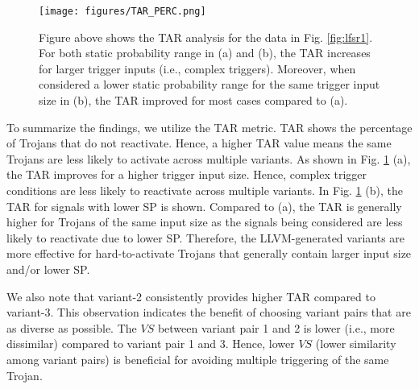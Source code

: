 \documentclass[conference]{IEEEtran}
\begin{document}
\begin{figure}[t!]
\centerline{\texttt{[image: figures/TAR\_PERC.png]}}
\caption{Figure above shows the TAR analysis for the data in Fig. \ref{fig:lfsr1}. 
For both static probability range in (a) and (b), the TAR increases for larger trigger inputs (i.e., complex triggers). Moreover, when considered a lower static probability range for the same trigger input size in (b), the TAR improved for most cases compared to (a). }
\label{fig:lfsr}
\end{figure}

To summarize the findings, we utilize the TAR metric. TAR shows the percentage of Trojans that do not reactivate. Hence, a higher TAR value means the same Trojans are less likely to activate across multiple variants. 
As shown in Fig. \ref{fig:lfsr} (a), the TAR improves for a higher trigger input size. Hence, complex trigger conditions are less likely to reactivate across multiple variants. In Fig. \ref{fig:lfsr} (b), the TAR for signals with lower SP is shown. Compared to (a), the TAR is generally higher for Trojans of the same input size as the signals being considered are less likely to reactivate due to lower SP.  
 Therefore, the LLVM-generated variants are more effective for hard-to-activate Trojans that generally contain larger input size and/or lower SP.
 
 

 We also note that variant-2  consistently provides higher TAR compared to variant-3. This observation indicates the benefit of choosing variant pairs that are as diverse as possible. The $VS$ between variant pair 1 and 2 is lower (i.e., more dissimilar) compared to variant pair 1 and 3. Hence, lower $VS$ (lower similarity among variant pairs) is beneficial for avoiding multiple triggering of the same Trojan. 
\end{document}
